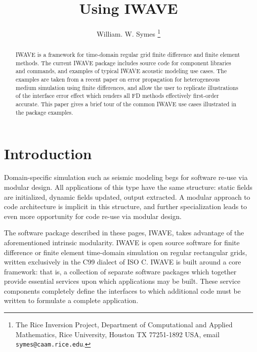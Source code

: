 \title{Using IWAVE}
\author{William. W. Symes \thanks{The Rice Inversion Project,
Department of Computational and Applied Mathematics, Rice University,
Houston TX 77251-1892 USA, email {\tt symes@caam.rice.edu}.}}

\maketitle

\begin{abstract}
  IWAVE is a framework for time-domain regular grid finite difference
  and finite element methods. The current IWAVE package includes
  source code for component libraries and commands, and 
  examples of typical IWAVE acoustic modeling use cases. The
  examples are taken from a recent paper on error propagation for
  heterogeneous medium simulation using finite differences, and allow
  the user to replicate illustrations of the interface error effect
  which renders all FD methods effectively first-order accurate.  This
  paper gives a brief tour of the common IWAVE use cases illustrated
  in the package examples.
\end{abstract}

\section{Introduction}
Domain-specific simulation such as seismic modeling begs for
software re-use via modular design. All applications of this type have
the same structure: static fields are initialized, dynamic fields
updated, output extracted. A modular approach to code architecture is
implicit in this structure, and further specialization leads to even more opportunity
for code re-use via modular design. 

The software package described in these pages, IWAVE, takes advantage
of the aforementioned intrinsic modularity. IWAVE is open source
software for finite difference or finite element time-domain
simulation on regular rectangular grids, written exclusively in the
C99 dialect of ISO C. IWAVE is built around a core framework: that is,
a collection of separate software packages which together provide
essential services upon which applications may be built. These
service components completely define the interfaces to which
additional code must be written to formulate a complete
application. 

